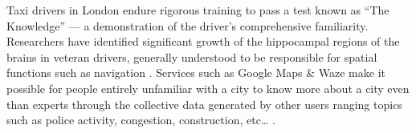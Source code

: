 \documentclass[trackingWork]{subfiles}
\begin{document}
Taxi drivers in London endure rigorous training to pass a test known as ``The Knowledge''
--- a demonstration of the driver's comprehensive familiarity.
Researchers have identified significant growth of
the hippocampal regions of the brains in veteran drivers,
generally understood to be responsible for spatial functions such as navigation
\cite{Maguire11042000,Maguire2894,Skok:1999:KML:299513.299625,
      skok2000managing,Woollett1407,woollett2011acquiring}.
Services such as Google Maps \& Waze make it possible for
people entirely unfamiliar with a city
to know more about a city even than experts through
the collective data generated by other users
ranging topics such as police activity, congestion, construction, etc\dots
\cite{silva2013traffic,hind2014outsmarting}.

\end{document}
